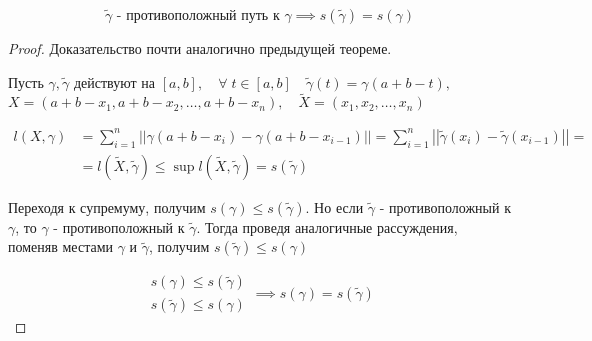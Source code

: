 \documentclass[../main.tex]{subfiles}
\begin{document}
\begin{thm}
    \[ \tilde{ \gamma }\text{ - противоположный путь к } \gamma \implies s( \tilde{ \gamma })=s\left( \gamma \right)\]
\end{thm}
\begin{proof}
    Доказательство почти аналогично предыдущей теореме. 

    Пусть \( \gamma , \tilde{ \gamma }\) действуют на \( \left[ a,b\right],\quad \forall \; t \in \left[ a,b\right]\quad \tilde{ \gamma }\left( t\right)= \gamma \left( a+b-t\right),\)
    \( X=(a+b-x_1,a+b-x_2, \dots,a+b-x_n),\quad \tilde{ X}=(x_1, x_2, \dots, x_n)\)

    \begin{equation*}
        \begin{aligned}
            l \left( X, \gamma \right)&= \sum\limits_{ i=1}^{ n} \left| \left| \gamma \left( a+b-x_i\right)- \gamma \left( a+b-x_{i-1}\right)\right|\right|= \sum\limits_{ i=1}^{ n} \left| \left| \tilde{ \gamma }\left( x_i\right)- \tilde{ \gamma }\left( x_{i-1}\right)\right|\right|=\\
            &=l( \tilde{ X}, \tilde{ \gamma }) \leq \sup\limits_{ } l( \tilde{ X}, \tilde{ \gamma })=s( \tilde{ \gamma } )
        \end{aligned}
    \end{equation*}

    Переходя к супремуму, получим \( s\left( \gamma \right) \leq s\left( \tilde{ \gamma }\right)\). Но если \( \tilde{ \gamma }\) - противоположный к \( \gamma \), то \( \gamma \) - противоположный к \( \tilde{ \gamma }\). Тогда проведя аналогичные рассуждения, поменяв местами \( \gamma \) и \( \tilde{ \gamma }\), получим \( s( \tilde{ \gamma }) \leq s\left( \gamma \right)\)

    \begin{equation*}
        \begin{aligned}
            s\left( \gamma \right) \leq s\left( \tilde{ \gamma }\right)\\ 
            s\left( \tilde{ \gamma }\right) \leq s\left( \gamma \right)
        \end{aligned}
        \implies 
        s\left( \gamma \right)=s\left( \tilde{ \gamma }\right)
    \end{equation*}
\end{proof}
\end{document}
